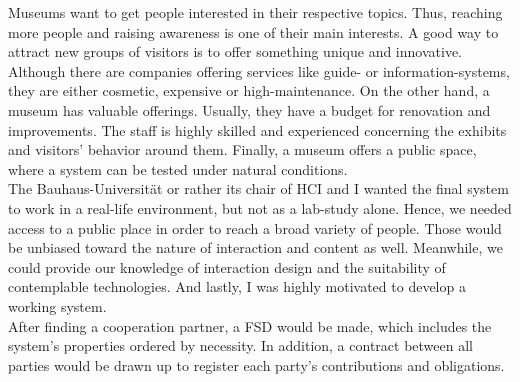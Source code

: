 Museums want to get people interested in their respective topics. Thus, reaching more people and raising awareness is one of their main interests. A good way to attract new groups of visitors is to offer something unique and innovative. Although there are companies offering services like guide- or information-systems, they are either cosmetic, expensive or high-maintenance. On the other hand, a museum has valuable offerings. Usually, they have a budget for renovation and improvements. The staff is highly skilled and experienced concerning the exhibits and visitors' behavior around them. Finally, a museum offers a public space, where a system can be tested under natural conditions.
\\ 
The Bauhaus-Universität or rather its chair of \ac{HCI} and I wanted the final system to work in a real-life environment, but not as a lab-study alone. Hence, we needed access to a public place in order to reach a broad variety of people. Those would be unbiased toward the nature of interaction and content as well. Meanwhile, we could provide our knowledge of interaction design and the suitability of contemplable technologies. And lastly, I was highly motivated to develop a working system.
\\
After finding a cooperation partner, a \ac{FSD} would be made, which includes the system's properties ordered by necessity. In addition, a contract between all parties would be drawn up to register each party's contributions and obligations.

